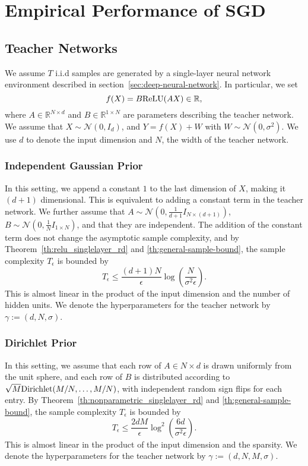 \documentclass[twoside,11pt]{article}
\def\normal{\mathcal{N}}
\def\relu{{\rm ReLU}}
\def\R{\mathbb{R}}
\begin{document}
\section{Empirical Performance of SGD}
\label{apdx:empir-perf-sgd}
\newlength{\tempht}
\newsavebox{\tempbox}
\subsection{Teacher Networks}
\label{apdx:teacher-networks-1-hidden}

We assume $T$ i.i.d samples are generated by a single-layer neural network environment described in section~\ref{sec:deep-neural-network}.
In particular, we set
\[
  f(X) = B\relu(AX) \in\R,
\]
where $A\in\R^{N\times d}$ and $B\in \R^{1\times N}$ are parameters describing the teacher network.
We assume that $X\sim \mathcal{N}(0,I_d)$, and $Y= f(X)+W$ with $W\sim \mathcal{N}(0, \sigma^2)$.
We use $d$ to denote the input dimension and $N$, the width of the teacher network.

\subsubsection{Independent Gaussian Prior}
\label{apdx:indep-gauss-prior-def}
In this setting, we append a constant $1$ to the last dimension of $X$, making it $(d+1)$ dimensional.
This is equivalent to adding a constant term in the teacher network.
We further assume that $A\sim\normal(0, \frac{1}{d+1}I_{N\times(d+1)})$, $B\sim\normal(0, \frac{1}{N} I_{1\times N} )$, and that they are independent.
The addition of the constant term does not change the asymptotic sample complexity, and by Theorem~\ref{th:relu_singlelayer_rd} and \ref{th:general-sample-bound}, the sample complexity $T_{\epsilon}$ is bounded by
\[
  T_{\epsilon} \le   \frac{(d+1)N}{\epsilon} \log \left( \frac{N}{\sigma^2\epsilon} \right) 
  .
\]
This is almost linear in the product of the input dimension and the number of hidden units.
We denote the hyperparameters for the teacher network by $\gamma:=(d, N, \sigma)$.
\subsubsection{Dirichlet Prior}
\label{apdx:nonparametric-prior-def}
In this setting, we assume that each row of $A\in N\times d$ is drawn uniformly from the unit sphere, and each row of $B$ is distributed according to $\sqrt{M} {\rm Dirichlet}(M/N, \ldots, M/N)$, with independent random sign flips for each entry.
By Theorem~\ref{th:nonparametric_singlelayer_rd} and \ref{th:general-sample-bound}, the sample complexity $T_{\epsilon}$ is bounded by
\[
  T_{\epsilon} \le  \frac{2dM}{\epsilon}\log^2 \left( \frac{6d}{\sigma^2\epsilon} \right)
  .
\]
This is almost linear in the product of the input dimension and the sparsity.
We denote the hyperparameters for the teacher network by $\gamma:=(d, N, M, \sigma)$.
\end{document}
